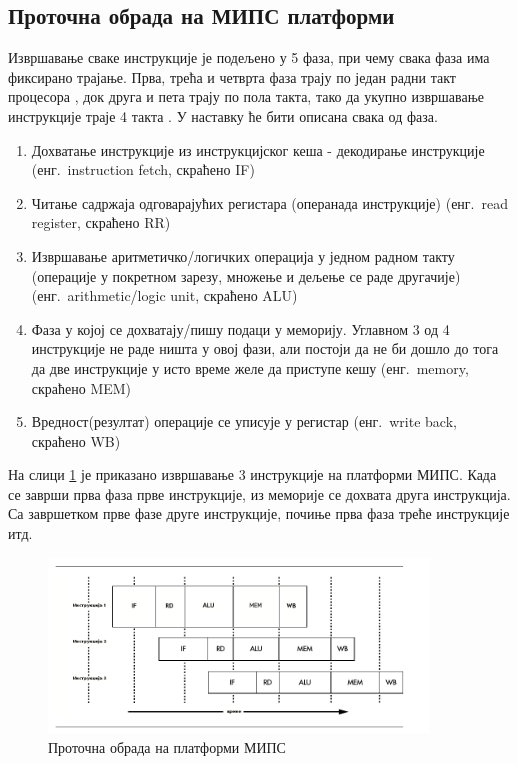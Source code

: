 \documentclass[12pt,oneside]{memoir}
\begin{document}
\subsection{Проточна обрада на МИПС платформи}

Извршавање сваке инструкције је подељено у 5 фаза, при чему свака фаза има фиксирано трајање. Прва, трећа и четврта фаза трају по један радни такт процесора , док друга и пета трају по пола такта, тако да укупно извршавање инструкције траје 4 такта \cite{mips}. У наставку ће бити описана свака од фаза.

\begin{enumerate}
\item Дохватање инструкције из инструкцијског кеша - декодирање инструкције (енг.~instruction fetch, скраћено IF)
\item Читање садржаја одговарајућих регистара (операнада инструкције) (енг.~read register, скраћено RR)
\item Извршавање аритметичко/логичких операција у једном радном такту (операције у покретном зарезу, множење и дељење се раде другачије) (енг.~arithmetic/logic unit, скраћено ALU)
\item  Фаза у којој се дохватају/пишу подаци у меморију. Углавном 3 од 4 инструкције не раде ништа у овој фази, али постоји да не би дошло до тога да две инструкције у исто време желе да приступе кешу (енг.~memory, скраћено MEM)
\item Вредност(резултат) операције се уписује у регистар (енг.~write back, скраћено WB)
\end{enumerate}

На слици \ref{fig:pipeline} је приказано извршавање 3 инструкције на платформи МИПС. Када се заврши прва фаза прве инструкције, из меморије се дохвата друга инструкција. Са завршетком прве фазе друге инструкције, почиње прва фаза треће инструкције итд. 

\begin{figure}[!ht]
  \centering
  \includegraphics[width=0.9\textwidth]{pipeline.png}
  \caption{Проточна обрада на платформи МИПС}
  \label{fig:pipeline}
\end{figure}
\end{document}
